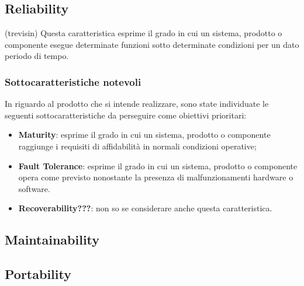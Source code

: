\subsection{Reliability} (trevisin)
Questa caratteristica esprime il grado in cui un sistema, prodotto o componente esegue determinate funzioni sotto determinate condizioni per un dato periodo di tempo.
\subsubsection{Sottocaratteristiche notevoli}
In riguardo al prodotto che si intende realizzare, sono state individuate le seguenti sottocaratteristiche da perseguire come obiettivi prioritari: 
\begin{itemize}
	\item{\textbf{Maturity}}: esprime il grado in cui un sistema, prodotto o componente raggiunge i requisiti di affidabilità in normali condizioni operative;
	\item{\textbf{Fault Tolerance}}: esprime il grado in cui un sistema, prodotto o componente opera come previsto nonostante la presenza di malfunzionamenti hardware o software.
	\item{\textbf{Recoverability???}}: non so se considerare anche questa caratteristica.
\end{itemize}

\subsection{Maintainability}
\subsection{Portability}

\pagebreak